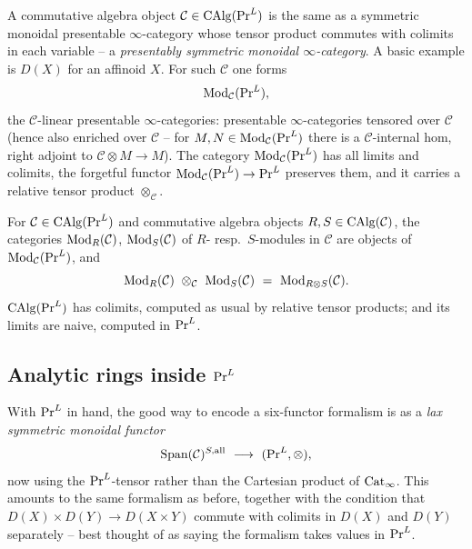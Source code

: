 \begin{proposition}
\label{prop:17:CAlg-PrL}
A commutative algebra object $\mathcal C\in\operatorname{CAlg}(\mathrm{Pr}^{L})$ is the same as a symmetric monoidal
presentable $\infty$-category whose tensor product commutes with colimits in each variable --
a \emph{presentably symmetric monoidal $\infty$-category}. A basic example is $D(X)$ for an
affinoid $X$. For such $\mathcal C$ one forms
\begin{equation*}
\operatorname{Mod}_{\mathcal C}(\mathrm{Pr}^{L}),
\end{equation*}
the $\mathcal C$-linear presentable $\infty$-categories: presentable $\infty$-categories
tensored over $\mathcal C$ (hence also enriched over $\mathcal C$ -- for $M,N\in\operatorname{Mod}_{\mathcal C}(\mathrm{Pr}^{L})$
there is a $\mathcal C$-internal hom, right adjoint to $\mathcal C\otimes M\to M$). The
category $\operatorname{Mod}_{\mathcal C}(\mathrm{Pr}^{L})$ has all limits and colimits, the forgetful functor
$\operatorname{Mod}_{\mathcal C}(\mathrm{Pr}^{L})\to\mathrm{Pr}^{L}$ preserves them, and it carries a relative tensor product
$\otimes_{\mathcal C}$.
\end{proposition}

\begin{example}
\label{ex:17:mod-tensor}
For $\mathcal C\in\operatorname{CAlg}(\mathrm{Pr}^{L})$ and commutative algebra objects $R,S\in\operatorname{CAlg}(\mathcal C)$, the
categories $\operatorname{Mod}_{R}(\mathcal C)$, $\operatorname{Mod}_{S}(\mathcal C)$ of $R$- resp.\ $S$-modules in
$\mathcal C$ are objects of $\operatorname{Mod}_{\mathcal C}(\mathrm{Pr}^{L})$, and
\begin{equation}
\label{eq:17:mod-tensor}
\Mod_{R}(\mathcal C)\ \otimes_{\mathcal C}\ \Mod_{S}(\mathcal C)\ =\ \Mod_{R\otimes S}(\mathcal C).
\end{equation}
$\operatorname{CAlg}(\mathrm{Pr}^{L})$ has colimits, computed as usual by relative tensor products; and its limits are
naive, computed in $\mathrm{Pr}^{L}$.
\end{example}

\subsection{Analytic rings inside \texorpdfstring{$\mathrm{Pr}^{L}$}{PrL}}
\label{subsec:17:anring-PrL}

With $\mathrm{Pr}^{L}$ in hand, the good way to encode a six-functor formalism is as a \emph{lax
symmetric monoidal functor}
\begin{equation*}
\operatorname{Span}(\mathcal C)^{S,\mathrm{all}}\ \longrightarrow\ (\mathrm{Pr}^{L},\otimes),
\end{equation*}
now using the $\mathrm{Pr}^{L}$-tensor rather than the Cartesian product of $\mathrm{Cat}_{\infty}$. This amounts
to the same formalism as before, together with the condition that
$D(X)\times D(Y)\to D(X\times Y)$ commute with colimits in $D(X)$ and $D(Y)$ separately --
best thought of as saying the formalism takes values in $\mathrm{Pr}^{L}$.

